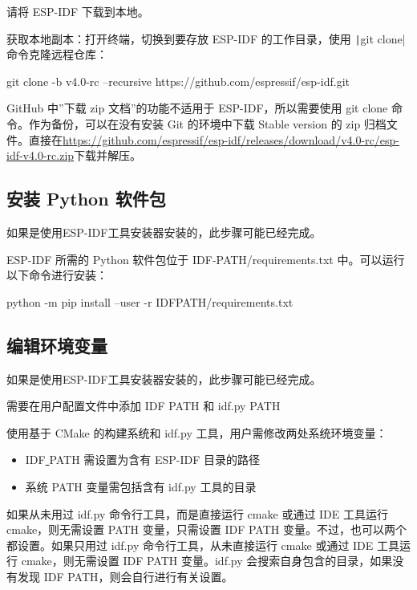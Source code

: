 请将 ESP-IDF 下载到本地。

获取本地副本：打开终端，切换到要存放 ESP-IDF 的工作目录，使用 \texttt|git clone| 命令克隆远程仓库：

\begin{tcolorbox}
    git clone -b v4.0-rc --recursive https://github.com/espressif/esp-idf.git
\end{tcolorbox}

GitHub 中”下载 zip 文档”的功能不适用于 ESP-IDF，所以需要使用 git clone 命令。作为备份，可以在没有安装 Git 的环境中下载 Stable version 的 zip 归档文件。直接在\url{https://github.com/espressif/esp-idf/releases/download/v4.0-rc/esp-idf-v4.0-rc.zip}下载并解压。

\subsection{安装 Python 软件包}

如果是使用ESP-IDF工具安装器安装的，此步骤可能已经完成。

ESP-IDF 所需的 Python 软件包位于 IDF-PATH/requirements.txt 中。可以运行以下命令进行安装：


\begin{tcolorbox}
    python -m pip install --user -r IDFPATH/requirements.txt
\end{tcolorbox}

\subsection{编辑环境变量}

如果是使用ESP-IDF工具安装器安装的，此步骤可能已经完成。

需要在用户配置文件中添加 IDF PATH 和 idf.py PATH

使用基于 CMake 的构建系统和 idf.py 工具，用户需修改两处系统环境变量：

\begin{itemize}
    \item IDF\underline{ }PATH 需设置为含有 ESP-IDF 目录的路径
    \item 系统 PATH 变量需包括含有 idf.py 工具的目录
\end{itemize}

如果从未用过 idf.py 命令行工具，而是直接运行 cmake 或通过 IDE 工具运行 cmake，则无需设置 PATH 变量，只需设置 IDF PATH 变量。不过，也可以两个都设置。如果只用过 idf.py 命令行工具，从未直接运行 cmake 或通过 IDE 工具运行 cmake，则无需设置 IDF PATH 变量。idf.py 会搜索自身包含的目录，如果没有发现 IDF PATH，则会自行进行有关设置。

